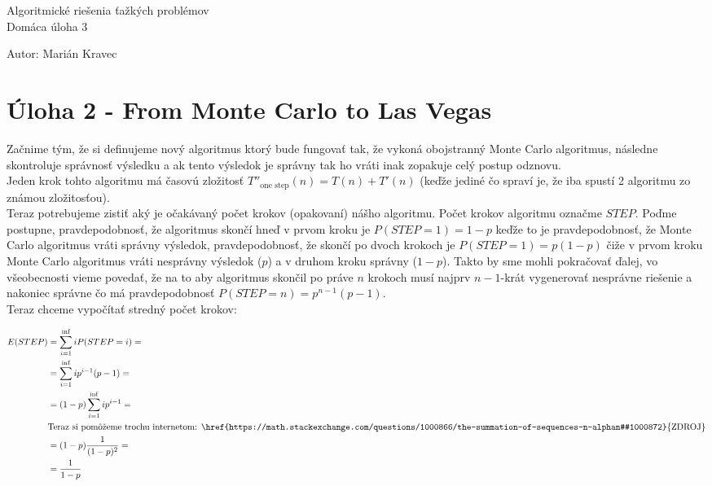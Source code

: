 \documentclass[a4paper]{article}
\begin{document}
 
	
\pagestyle{plain}

\begin{center}
	\sc\large
	Algoritmické riešenia ťažkých problémov\\
	Domáca úloha 3
\end{center}

Autor: Marián Kravec

\section{Úloha 2 - From Monte Carlo to Las Vegas}

Začnime tým, že si definujeme nový algoritmus ktorý bude fungovať tak, že vykoná obojstranný Monte Carlo algoritmus, následne skontroluje správnosť výsledku a ak tento výsledok je správny tak ho vráti inak zopakuje celý postup odznovu.
\\

Jeden krok tohto algoritmu má časovú zložitosť $T''_{\text{one step}}(n) = T(n) + T'(n)$ (keďže jediné čo spraví je, že iba spustí 2 algoritmu zo známou zložitosťou).
\\

Teraz potrebujeme zistiť aký je očakávaný počet krokov (opakovaní) nášho algoritmu. Počet krokov algoritmu označme $STEP$. Poďme postupne, pravdepodobnosť, že algoritmus skončí hneď v prvom kroku je $P(STEP=1)=1-p$ keďže to je pravdepodobnosť, že Monte Carlo algoritmus vráti správny výsledok, pravdepodobnosť, že skončí po dvoch krokoch je $P(STEP=1)=p(1-p)$ čiže v prvom kroku Monte Carlo algoritmus vráti nesprávny výsledok ($p$) a v druhom kroku správny ($1-p$). Takto by sme mohli pokračovať ďalej, vo všeobecnosti vieme povedať, že na to aby algoritmus skončil po práve $n$ krokoch musí najprv $n-1$-krát vygenerovať nesprávne riešenie a nakoniec správne čo má pravdepodobnosť $P(STEP=n)=p^{n-1}(p-1)$.
\\

Teraz chceme vypočítať stredný počet krokov:

\begin{align*}
	E(STEP) &= \sum_{i=1}^{\inf} iP(STEP=i) =\\
	&= \sum_{i=1}^{\inf} ip^{i-1}(p-1) =\\
	&= (1-p)\sum_{i=1}^{\inf} ip^{i-1} =\\
	&\text{Teraz si pomôžeme trochu internetom: \href{https://math.stackexchange.com/questions/1000866/the-summation-of-sequences-n-alphan#1000872}{ZDROJ}}\\
	&= (1-p)\frac{1}{(1-p)^2} =\\
	&= \frac{1}{1-p}
\end{align*}
\end{document}
